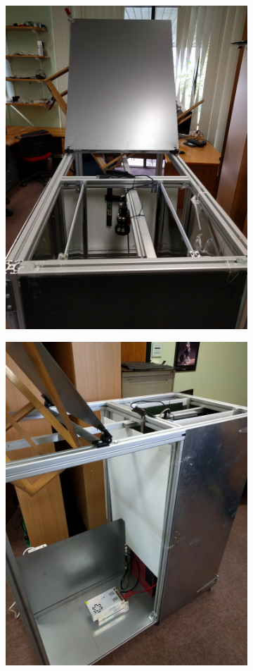 \documentclass[fleqn,twoside]{article}
\begin{document}
\begin{figure}[h]
	\centering
	\begin{subfigure}{.5\textwidth}
		\centering
		\includegraphics[width=.9\linewidth]{system_v2_construct_1.jpg}
		\caption{}
		\label{fig:system_v2_construct_1}
	\end{subfigure}%
	\begin{subfigure}{.5\textwidth}
		\centering
		\includegraphics[width=0.9\linewidth]{system_v2_construct_2.jpg}

\end{subfigure}
\end{figure}
\end{document}
